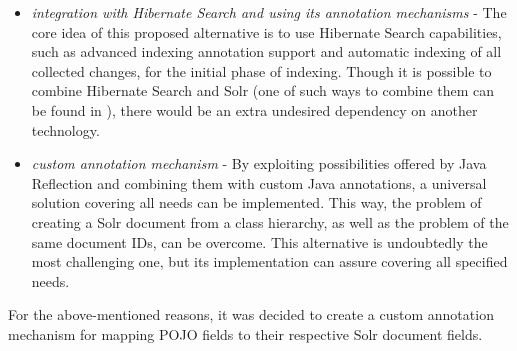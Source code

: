 \begin{itemize}
\item \textit{integration with Hibernate Search and using its annotation mechanisms}
 - The core idea of this proposed alternative is to use Hibernate Search capabilities, such as advanced indexing annotation support and automatic indexing of all collected changes, for the initial phase of indexing. 
Though it is possible to combine Hibernate Search and Solr (one of such ways to combine them can be found in \cite{HibSearch:CombinationSolr}), there would be an extra undesired dependency on another technology. 

\item \textit{custom annotation mechanism}
- By exploiting possibilities offered by Java Reflection and combining them with custom Java annotations, a universal solution covering all needs can be implemented.
This way, the problem of creating a Solr document from a class hierarchy, as well as the problem of the same document IDs, can be overcome. 
This alternative is undoubtedly the most challenging one, but its implementation can assure covering all specified needs. 



\end{itemize}

For the above-mentioned reasons, it was decided to create a custom annotation mechanism for mapping POJO fields to their respective Solr document fields.

